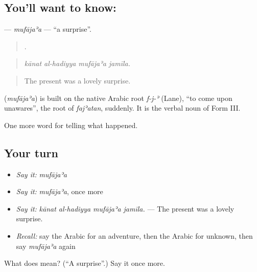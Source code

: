 \subsection*{You'll want to know: }
\textbf{} — \emph{mufājaʾa} — \textquotedblleft{}a surprise\textquotedblright{}.

\begin{quote}
   .
\end{quote}

\begin{quote}
\emph{kānat al-hadiyya mufājaʾa jamīla.}
\end{quote}

\begin{quote}
The present was a lovely surprise.
\end{quote}

\begin{cousinweb}
\textbf{} (\emph{mufājaʾa}) is built on the native Arabic root \emph{f-j-ʾ} (Lane), \textquotedblleft{}to come upon unawares\textquotedblright{}, the root of \emph{fajʾatan}, suddenly. It is the verbal noun of Form III.
\end{cousinweb}

\begin{grammarlens}[title={What you've built}]
One more word for telling what happened.
\end{grammarlens}

\subsection*{Your turn}
\begin{itemize}
\raggedright
  \item \emph{Say it:} \emph{mufājaʾa}
  \item \emph{Say it:} \emph{mufājaʾa}, once more
  \item \emph{Say it:} \emph{kānat al-hadiyya mufājaʾa jamīla.} — The present was a lovely surprise.
  \item \emph{Recall:} say the Arabic for an adventure, then the Arabic for unknown, then say \emph{mufājaʾa} again
\end{itemize}

\begin{tcolorbox}[breakable,colback=teal!4,colframe=teal!35!black,title={Before you move on}]
What does  mean? (\textquotedblleft{}A surprise\textquotedblright{}.) Say it once more.
\end{tcolorbox}
